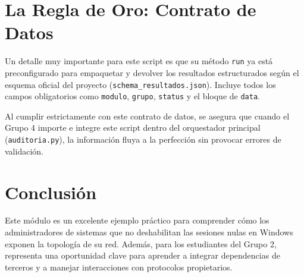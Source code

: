 \documentclass[12pt,a4paper]{article}
\begin{document}
\section*{La Regla de Oro: Contrato de Datos}
Un detalle muy importante para este script es que su método \texttt{run} ya está preconfigurado para empaquetar y devolver los resultados estructurados según el esquema oficial del proyecto (\texttt{schema\_resultados.json}). Incluye todos los campos obligatorios como \texttt{modulo}, \texttt{grupo}, \texttt{status} y el bloque de \texttt{data}.

Al cumplir estrictamente con este contrato de datos, se asegura que cuando el Grupo 4 importe e integre este script dentro del orquestador principal (\texttt{auditoria.py}), la información fluya a la perfección sin provocar errores de validación.

\section*{Conclusión}
Este módulo es un excelente ejemplo práctico para comprender cómo los administradores de sistemas que no deshabilitan las sesiones nulas en Windows exponen la topología de su red. Además, para los estudiantes del Grupo 2, representa una oportunidad clave para aprender a integrar dependencias de terceros y a manejar interacciones con protocolos propietarios.
\end{document}
